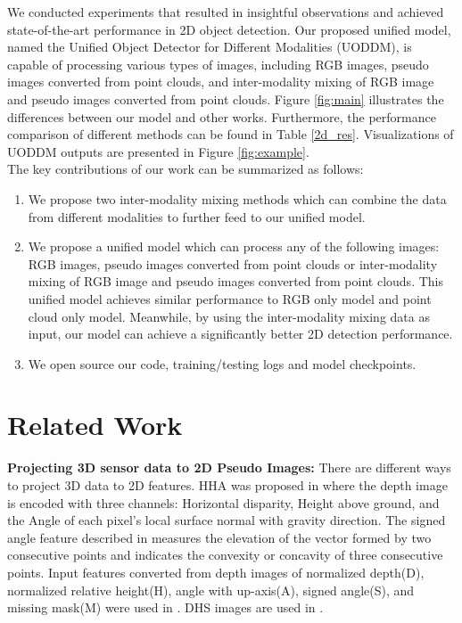 \documentclass[]{modified_llncs}
\begin{document}
We conducted experiments that resulted in insightful observations and achieved state-of-the-art performance in 2D object detection. Our proposed unified model, named the Unified Object Detector for Different Modalities (UODDM), is capable of processing various types of images, including RGB images, pseudo images converted from point clouds, and inter-modality mixing of RGB image and pseudo images converted from point clouds. Figure \ref{fig:main} illustrates the differences between our model and other works. Furthermore, the performance comparison of different methods can be found in Table \ref{2d_res}. Visualizations of UODDM outputs are presented in Figure \ref{fig:example}.\\
The key contributions of our work can be summarized as follows:\\
\begin{enumerate}
\item We propose two inter-modality mixing methods which can combine the data from different modalities to further feed to our unified model.
\item We propose a unified model which can process any of the following images: RGB images, pseudo images converted from point clouds or inter-modality mixing of RGB image and pseudo images converted from point clouds. This unified model achieves similar performance to RGB only model and point cloud only model. Meanwhile, by using the inter-modality mixing data as input, our model can achieve a significantly better 2D detection performance.
\item We open source our code, training/testing logs and model checkpoints.
\end{enumerate}
\section{Related Work}
\textbf {Projecting 3D sensor data to 2D Pseudo Images: } There are different ways to project 3D data to 2D features. HHA was proposed in \cite{GuptaGAM14} where the depth image is encoded with three channels: Horizontal disparity, Height above ground, and the Angle of each pixel’s local surface normal with gravity direction. The signed angle feature described in\cite{6375012} measures the elevation of the vector formed by two consecutive points and indicates the convexity or concavity of three consecutive points. Input features converted from depth images of normalized depth(D), normalized relative height(H), angle with up-axis(A), signed angle(S), and missing mask(M) were used in \cite{7785116}. DHS images are used in \cite{Shen_2020_WACV,Shen_2020_v2}. \\
\end{document}
